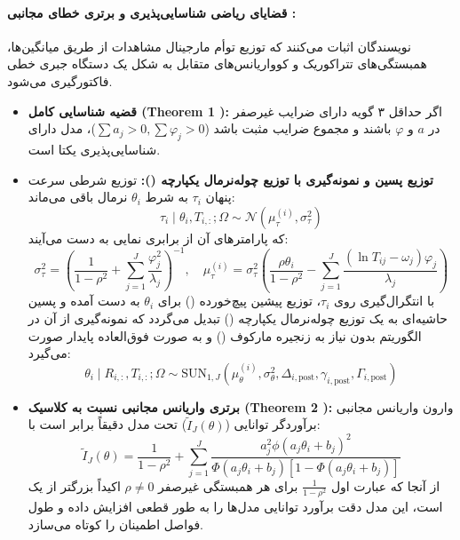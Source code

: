 \paragraph*{قضایای ریاضی شناسایی‌پذیری و برتری خطای مجانبی :}
نویسندگان اثبات می‌کنند که توزیع توأم مارجینال مشاهدات از طریق میانگین‌ها، همبستگی‌های تتراکوریک و کوواریانس‌های متقابل به شکل یک دستگاه جبری خطی فاکتورگیری می‌شود.
\begin{itemize}
    \item \textbf{قضیه شناسایی کامل (Theorem 1 \cite{xu2026latency}):} اگر حداقل ۳ گویه دارای ضرایب غیرصفر در $a$ و $\varphi$ باشند و مجموع ضرایب مثبت باشد ($\sum a_j > 0, \sum \varphi_j > 0$)، مدل  دارای شناسایی‌پذیری یکتا است.
    \item \textbf{توزیع پسین و نمونه‌گیری با توزیع چوله‌نرمال یکپارچه ():}
    توزیع شرطی سرعت پنهان $\tau_i$ به شرط $\theta_i$ نرمال باقی می‌ماند:
    \begin{equation}
        \tau_i \mid \theta_i, T_{i,:}; \Omega \sim \mathcal{N}\left( \mu_\tau^{(i)}, \sigma_\tau^2 \right)
    \end{equation}
    که پارامترهای آن از برابری نمایی به دست می‌آیند:
    \begin{equation}
        \sigma_\tau^2 = \left( \frac{1}{1-\rho^2} + \sum_{j=1}^J \frac{\varphi_j^2}{\lambda_j} \right)^{-1}, \quad \mu_\tau^{(i)} = \sigma_\tau^2 \left( \frac{\rho \theta_i}{1-\rho^2} - \sum_{j=1}^J \frac{(\ln T_{ij} - \omega_j)\varphi_j}{\lambda_j} \right)
    \end{equation}
    با انتگرال‌گیری روی $\tau_i$، توزیع پیشین پیچ‌خورده () برای $\theta_i$ به دست آمده و پسین حاشیه‌ای به یک توزیع چوله‌نرمال یکپارچه () تبدیل می‌گردد که نمونه‌گیری از آن در الگوریتم  بدون نیاز به زنجیره مارکوف () و به صورت فوق‌العاده پایدار صورت می‌گیرد:
    \begin{equation}
        \theta_i \mid R_{i,:}, T_{i,:}; \Omega \sim \text{SUN}_{1,J} \left( \mu_\theta^{(i)}, \sigma_\theta^2, \Delta_{i,\text{post}}, \gamma_{i,\text{post}}, \Gamma_{i,\text{post}} \right)
    \end{equation}
    \item \textbf{برتری واریانس مجانبی نسبت به  کلاسیک (Theorem 2 \cite{xu2026latency}):}
    وارون واریانس مجانبی برآوردگر توانایی ($\tilde{I}_J(\theta)$) تحت مدل  دقیقاً برابر است با:
    \begin{equation}
        \tilde{I}_J(\theta) = \frac{1}{1 - \rho^2} + \sum_{j=1}^J \frac{a_j^2 \phi(a_j \theta_i + b_j)^2}{\Phi(a_j \theta_i + b_j)[1 - \Phi(a_j \theta_i + b_j)]}
    \end{equation}
    از آنجا که عبارت اول $\frac{1}{1-\rho^2}$ برای هر همبستگی غیرصفر $\rho \neq 0$ اکیداً بزرگتر از یک است، این مدل دقت برآورد توانایی مدل‌ها را به طور قطعی افزایش داده و طول فواصل اطمینان را کوتاه می‌سازد.
\end{itemize}


